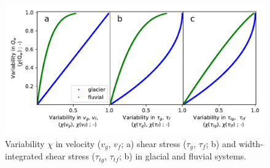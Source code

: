 \documentclass[11pt]{article}
\begin{document}
\begin{center}
  \begin{figure}[H]
    \includegraphics[width=0.9\linewidth]{multi_run_vars.pdf}
    \caption{Variability $\chi$ in velocity ($v_g$, $v_f$; a) shear stress ($\tau_g$, $\tau_f$; b) and width-integrated shear stress ($\tau_{tg}$, $\tau_{tf}$; b)  in glacial and fluvial systems. }
    \label{fig:gammas}
  \end{figure}
\end{center}
\end{document}
